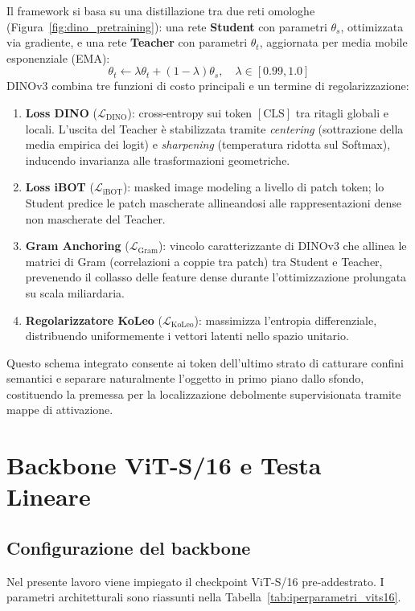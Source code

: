 Il framework si basa su una distillazione tra due reti omologhe (Figura~\ref{fig:dino_pretraining}): una rete \textbf{Student} con parametri $\theta_s$, ottimizzata via gradiente, e una rete \textbf{Teacher} con parametri $\theta_t$, aggiornata per media mobile esponenziale (EMA):
\begin{equation}
    \theta_t \leftarrow \lambda \theta_t + (1 - \lambda) \theta_s, \quad \lambda \in [0.99, 1.0]
\end{equation}
DINOv3 combina tre funzioni di costo principali e un termine di regolarizzazione:
\begin{enumerate}
    \item \textbf{Loss DINO} ($\mathcal{L}_{\mathrm{DINO}}$): cross-entropy sui token $[\mathrm{CLS}]$ tra ritagli globali e locali. L'uscita del Teacher è stabilizzata tramite \textit{centering} (sottrazione della media empirica dei logit) e \textit{sharpening} (temperatura ridotta sul Softmax), inducendo invarianza alle trasformazioni geometriche.
    \item \textbf{Loss iBOT} ($\mathcal{L}_{\mathrm{iBOT}}$): masked image modeling a livello di patch token; lo Student predice le patch mascherate allineandosi alle rappresentazioni dense non mascherate del Teacher.
    \item \textbf{Gram Anchoring} ($\mathcal{L}_{\mathrm{Gram}}$): vincolo caratterizzante di DINOv3 che allinea le matrici di Gram (correlazioni a coppie tra patch) tra Student e Teacher, prevenendo il collasso delle feature dense durante l'ottimizzazione prolungata su scala miliardaria.
    \item \textbf{Regolarizzatore KoLeo} ($\mathcal{L}_{\mathrm{KoLeo}}$): massimizza l'entropia differenziale, distribuendo uniformemente i vettori latenti nello spazio unitario.
\end{enumerate}
Questo schema integrato consente ai token dell'ultimo strato di catturare confini semantici e separare naturalmente l'oggetto in primo piano dallo sfondo, costituendo la premessa per la localizzazione debolmente supervisionata tramite mappe di attivazione.

\section{Backbone ViT-S/16 e Testa Lineare}
\label{sec:arch_linear_probing}

\subsection{Configurazione del backbone}
Nel presente lavoro viene impiegato il checkpoint ViT-S/16 pre-addestrato. I parametri architetturali sono riassunti nella Tabella~\ref{tab:iperparametri_vits16}.

